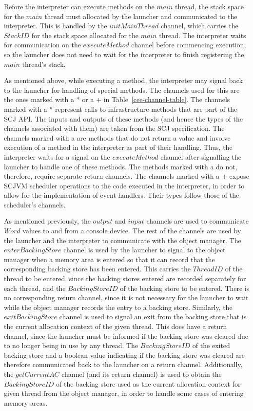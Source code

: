 Before the interpreter can execute methods on the $main$ thread, the
stack space for the $main$ thread must allocated by the launcher and
communicated to the interpreter.
This is handled by the $initMainThread$ channel, which carries the
$StackID$ for the stack space allocated for the $main$ thread.
The interpreter waits for communication on the $executeMethod$ channel
before commencing execution, so the launcher does not need to wait for
the interpreter to finish registering the $main$ thread's stack.

As mentioned above, while executing a method, the interpreter may
signal back to the launcher for handling of special methods.
The channels used for this are the ones marked with a * or a {}+{} in
Table~\ref{cee-channel-table}.
The channels marked with a * represent calls to infrastructure methods
that are part of the SCJ API.
The inputs and outputs of these methods (and hence the types of the
channels associated with them) are taken from the SCJ specification.
The channels marked with a \dag{} are methods that do not return a
value and involve execution of a method in the interpreter as part of
their handling.
Thus, the interpreter waits for a signal on the $executeMethod$
channel after signalling the launcher to handle one of these methods.
The methods marked with a \dag{} do not, therefore, require separate
return channels.
The channels marked with a + expose SCJVM scheduler operations to the
code executed in the interpreter, in order to allow for the
implementation of event handlers. 
Their types follow those of the scheduler's channels.

As mentioned previously, the $output$ and $input$ channels are used to
communicate $Word$ values to and from a console device.
The rest of the channels are used by the launcher and the interpreter
to communicate with the object manager.
The $enterBackingStore$ channel is used by the launcher to signal to
the object manager when a memory area is entered so that it can record
that the corresponding backing store has been entered.
This carries the $ThreadID$ of the thread to be entered, since the
backing stores entered are recorded separately for each thread, and
the $BackingStoreID$ of the backing store to be entered.
There is no corresponding return channel, since it is not necessary
for the launcher to wait while the object manager records the entry to
a backing store.
Similarly, the $exitBackingStore$ channel is used to signal an exit
from the backing store that is the current allocation context of the
given thread.
This does have a return channel, since the launcher must be informed
if the backing store was cleared due to no longer being in use by any
thread.
The $BackingStoreID$ of the exited backing store and a boolean value
indicating if the backing store was cleared are therefore communicated
back to the launcher on a return channel.
Additionally, the $getCurrentAC$ channel (and its return channel) is
used to obtain the $BackingStoreID$ of the backing store used as the
current allocation context for given thread from the object manager,
in order to handle some cases of entering memory areas.

